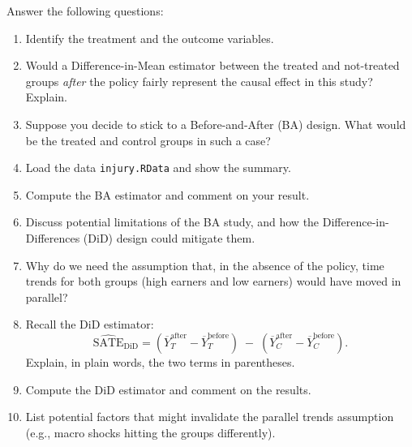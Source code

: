 \documentclass[12pt]{article}
\begin{document}
Answer the following questions:
\begin{enumerate}
  \item Identify the treatment and the outcome variables.
  \item Would a Difference-in-Mean estimator between the treated and not-treated groups \emph{after} the policy fairly represent the causal effect in this study? Explain.
  \item Suppose you decide to stick to a Before-and-After (BA) design. What would be the treated and control groups in such a case?
  \item Load the data \texttt{injury.RData} and show the summary.
  \item Compute the BA estimator and comment on your result.
  \item Discuss potential limitations of the BA study, and how the Difference-in-Differences (DiD) design could mitigate them.
  \item Why do we need the assumption that, in the absence of the policy, time trends for both groups (high earners and low earners) would have moved in parallel?
  \item Recall the DiD estimator:
  \[
     \widehat{\mathrm{SATE}}_{\mathrm{DiD}} 
       = (\overline{Y}_T^{\mathrm{after}} - \overline{Y}_T^{\mathrm{before}}) 
         \;-\; 
         (\overline{Y}_C^{\mathrm{after}} - \overline{Y}_C^{\mathrm{before}}).
  \]
  Explain, in plain words, the two terms in parentheses.
  \item Compute the DiD estimator and comment on the results.
  \item List potential factors that might invalidate the parallel trends assumption (e.g., macro shocks hitting the groups differently).
\end{enumerate}
\end{document}
